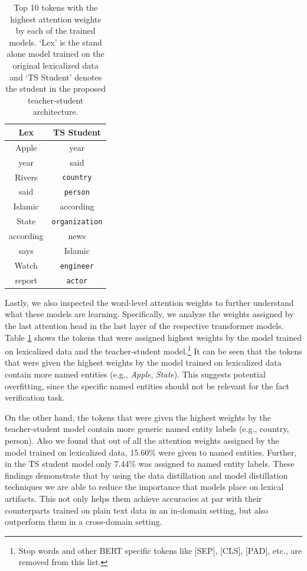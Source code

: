\begin{table}[h]
\begin{center}
\begin{small}
\begin{tabular}{ c  |c }
Lex & TS Student \\
\hline
Apple&year\\
year& said\\
Rivers& {\tt country}\\
said& \texttt{person}\\
Islamic& according\\
State& \texttt{organization}\\
according& news\\
says& Islamic\\
Watch& \texttt{engineer}\\
report& \texttt{actor}\\

\end{tabular}
\end{small}
\end{center}
\caption{ Top 10 tokens with the highest attention weights by each of the trained models. `Lex' is the stand alone model trained on the original lexicalized data and `TS Student' denotes the student in the proposed teacher-student architecture.}
\label{attention_weights}

\end{table}

Lastly, we also inspected the word-level attention weights \citep{bahdanau2014neural} to further understand what these models are learning. Specifically, we analyze the weights assigned by the last attention head in the last layer of the respective transformer models. Table \ref{attention_weights} shows the tokens that were assigned highest weights by the model trained on lexicalized data and the teacher-student model.\footnote{Stop words and other BERT specific tokens like [SEP], [CLS], [PAD], etc., are removed from this list.} It can be seen that the tokens that were given the highest weights by the model trained on lexicalized data contain more named entities (e.g., {\em Apple}, {\em State}). This suggests potential overfitting, since the specific named entities should not be relevant for the fact verification task.

On the other hand, the tokens that were given the highest weights by the teacher-student model contain more generic named entity labels (e.g., country, person). Also we found that out of all the attention weights assigned by the model trained on lexicalized data, 15.60\% were given to named entities. Further, in the  TS student model only 7.44\% was assigned to named entity labels. These findings demonstrate that by using the data distillation and model distillation techniques we are able to reduce the importance that models place on lexical artifacts. This not only helps them achieve accuracies at par with their counterparts trained on plain text data in an
in-domain setting, but also outperform them in a cross-domain setting.


